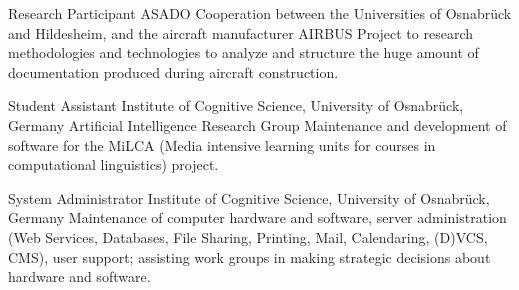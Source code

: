         {Research Participant}
        {ASADO}
        {Cooperation between the Universities of Osnabr\"{u}ck and Hildesheim,
        and the aircraft manufacturer AIRBUS}
        {}
        {Project to research methodologies and
        technologies to analyze and structure the huge amount of documentation
        produced during aircraft construction.}

        {Student Assistant}
        {Institute of Cognitive Science, University of Osnabr\"{u}ck, Germany}
        {Artificial Intelligence Research Group}
        {}
        {Maintenance and development of software for the MiLCA (Media intensive
        learning units for courses in computational linguistics) project.}

        {System Administrator}
        {Institute of Cognitive Science, University of Osnabr\"{u}ck, Germany}
        {}
        {}
        {Maintenance of computer hardware and software, server administration
        (Web Services, Databases, File Sharing, Printing, Mail, Calendaring,
        (D)VCS, CMS), user support; assisting work groups in making strategic
        decisions about hardware and software.}




